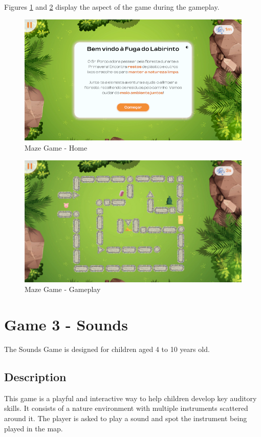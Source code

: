 Figures \ref{fig:mazeHome} and \ref{fig:mazeGameplay} display the aspect of the game during the gameplay.

\begin{figure}[H]
    \centering
    \includegraphics[width=0.9\linewidth]{Chapters/gameplay/new_screens/maze_home.png}
    \caption{Maze Game - Home}
    \label{fig:mazeHome}    
\end{figure}

\begin{figure}[H]
    \centering
    \includegraphics[width=0.9\linewidth]{Chapters/gameplay/MazeGame.jpg}
    \caption{Maze Game - Gameplay}
    \label{fig:mazeGameplay}    
\end{figure}

\newpage
\section{Game 3 - Sounds}
\label{c3Sounds}

The Sounds Game is designed for children aged 4 to 10 years old.

\subsection*{Description}
This game is a playful and interactive way to help children develop key auditory skills. It consists of a nature environment with multiple instruments scattered around it. The player is asked to play a sound and spot the instrument being played in the map.

